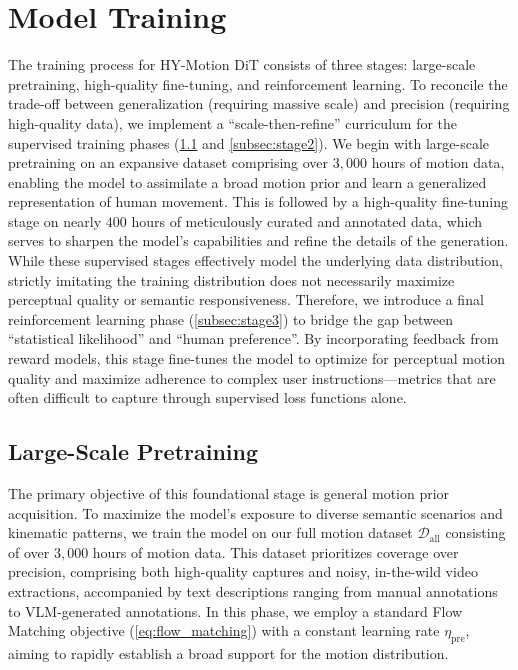 \section{Model Training}
\label{sec:training}

The training process for HY-Motion DiT consists of three stages: large-scale pretraining, high-quality fine-tuning, and reinforcement learning. 
To reconcile the trade-off between generalization (requiring massive scale) and precision (requiring high-quality data), we implement a ``scale-then-refine'' curriculum for the supervised training phases (\cref{subsec:stage1} and \cref{subsec:stage2}).
We begin with large-scale pretraining on an expansive dataset comprising over $3,000$ hours of motion data, enabling the model to assimilate a broad motion prior and learn a generalized representation of human movement.
This is followed by a high-quality fine-tuning stage on nearly $400$ hours of meticulously curated and annotated data, which serves to sharpen the model's capabilities and refine the details of the generation.
While these supervised stages effectively model the underlying data distribution, strictly imitating the training distribution does not necessarily maximize perceptual quality or semantic responsiveness.
Therefore, we introduce a final reinforcement learning phase (\cref{subsec:stage3}) to bridge the gap between ``statistical likelihood'' and ``human preference''.
By incorporating feedback from reward models, this stage fine-tunes the model to optimize for perceptual motion quality and maximize adherence to complex user instructions—metrics that are often difficult to capture through supervised loss functions alone.



\subsection{Large-Scale Pretraining}
\label{subsec:stage1}

The primary objective of this foundational stage is general motion prior acquisition.
To maximize the model's exposure to diverse semantic scenarios and kinematic patterns, we train the model on our full motion dataset $\mathcal{D}_{\text{all}}$ consisting of over $3,000$ hours of motion data. 
This dataset prioritizes coverage over precision, comprising both high-quality captures and noisy, in-the-wild video extractions, accompanied by text descriptions ranging from manual annotations to VLM-generated annotations.
In this phase, we employ a standard Flow Matching objective (\cref{eq:flow_matching}) with a constant learning rate $\eta_{\text{pre}}$, aiming to rapidly establish a broad support for the motion distribution.

